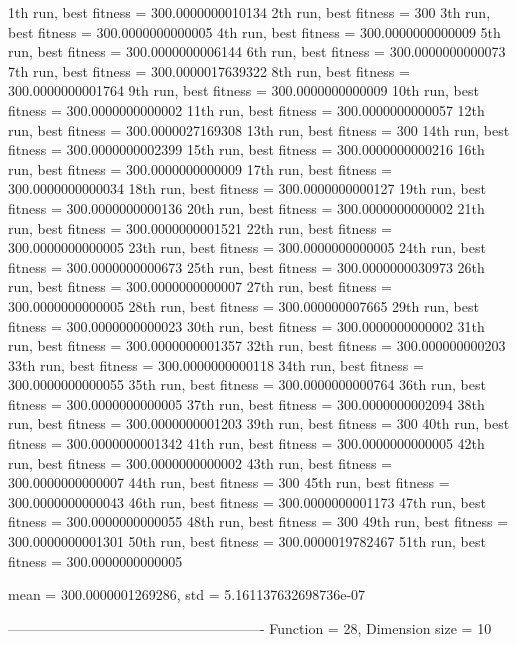 1th run, best fitness = 300.0000000010134
2th run, best fitness = 300
3th run, best fitness = 300.0000000000005
4th run, best fitness = 300.0000000000009
5th run, best fitness = 300.0000000006144
6th run, best fitness = 300.0000000000073
7th run, best fitness = 300.0000017639322
8th run, best fitness = 300.0000000001764
9th run, best fitness = 300.0000000000009
10th run, best fitness = 300.0000000000002
11th run, best fitness = 300.0000000000057
12th run, best fitness = 300.0000027169308
13th run, best fitness = 300
14th run, best fitness = 300.0000000002399
15th run, best fitness = 300.0000000000216
16th run, best fitness = 300.0000000000009
17th run, best fitness = 300.0000000000034
18th run, best fitness = 300.0000000000127
19th run, best fitness = 300.0000000000136
20th run, best fitness = 300.0000000000002
21th run, best fitness = 300.0000000001521
22th run, best fitness = 300.0000000000005
23th run, best fitness = 300.0000000000005
24th run, best fitness = 300.0000000000673
25th run, best fitness = 300.0000000030973
26th run, best fitness = 300.0000000000007
27th run, best fitness = 300.0000000000005
28th run, best fitness = 300.000000007665
29th run, best fitness = 300.0000000000023
30th run, best fitness = 300.0000000000002
31th run, best fitness = 300.0000000001357
32th run, best fitness = 300.000000000203
33th run, best fitness = 300.0000000000118
34th run, best fitness = 300.0000000000055
35th run, best fitness = 300.0000000000764
36th run, best fitness = 300.0000000000005
37th run, best fitness = 300.0000000002094
38th run, best fitness = 300.0000000001203
39th run, best fitness = 300
40th run, best fitness = 300.0000000001342
41th run, best fitness = 300.0000000000005
42th run, best fitness = 300.0000000000002
43th run, best fitness = 300.0000000000007
44th run, best fitness = 300
45th run, best fitness = 300.0000000000043
46th run, best fitness = 300.0000000001173
47th run, best fitness = 300.0000000000055
48th run, best fitness = 300
49th run, best fitness = 300.0000000001301
50th run, best fitness = 300.0000019782467
51th run, best fitness = 300.0000000000005

mean = 300.0000001269286, std = 5.161137632698736e-07

-------------------------------------------------------
Function = 28, Dimension size = 10

